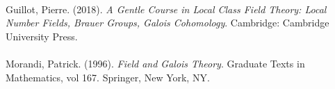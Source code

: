 \documentclass{article}
\begin{document}
 \\\\\\
\noindent Guillot, Pierre. (2018). \emph{A Gentle Course in Local Class Field Theory: Local Number Fields, Brauer Groups, Galois Cohomology}. Cambridge: Cambridge University Press. \\\\
\noindent Morandi, Patrick. (1996). \emph{Field and Galois Theory}. Graduate Texts in Mathematics, vol 167. Springer, New York, NY. \\\\
\end{document}
